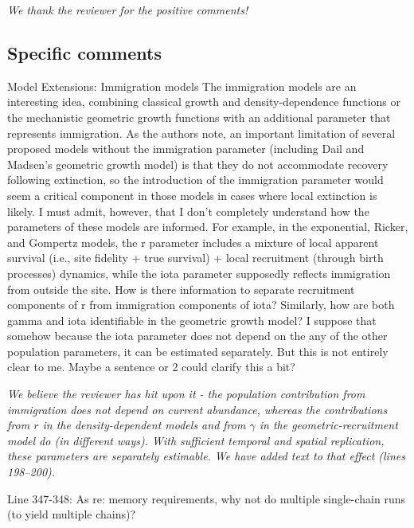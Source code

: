 \documentclass[12pt,english]{article}
\begin{document}
\begin{spacing}{1.9}
\begin{flushleft}
\vspace{0.5cm}
\textit{We thank the reviewer for the positive comments!}
\vspace{0.5cm}

\subsection*{Specific comments} 
Model Extensions: Immigration models 
The immigration models are an interesting idea, combining classical growth and
density-dependence functions or the mechanistic geometric growth functions with
an additional parameter that represents immigration. As the authors note, an
important limitation of several proposed models without the immigration
parameter (including Dail and Madsen's geometric growth model) is that they do
not accommodate recovery following extinction, so the introduction of the
immigration parameter would seem a critical component in those models in cases
where local extinction is likely. I must admit, however, that I don't completely
understand how the parameters of these models are informed. For example, in the
exponential, Ricker, and Gompertz models, the r parameter includes a mixture of
local apparent survival (i.e., site fidelity + true survival) + local
recruitment (through birth processes) dynamics, while the iota parameter
supposedly reflects immigration from outside the site. How is there
information to separate recruitment components of r from immigration components
of iota? Similarly, how are both gamma and iota identifiable in the geometric
growth model? I suppose that somehow because the iota parameter does not depend
on the any of the other population parameters, it can be estimated separately.
But this is not entirely clear to me. Maybe a sentence or 2 could clarify this a
bit?

\vspace{0.5cm}
\textit{We believe the reviewer has hit upon it - the population contribution from immigration
does not depend on current abundance, whereas the contributions from $r$ in the density-dependent
models and from $\gamma$ in the geometric-recruitment model do (in different ways).  With sufficient
temporal and spatial replication, these parameters are separately estimable.  We have added text to that
effect (lines 198--200).}
\vspace{0.5cm}

Line 347-348: As re: memory requirements, why not do multiple single-chain runs
(to yield multiple chains)?


\end{flushleft}
\end{spacing}
\end{document}
